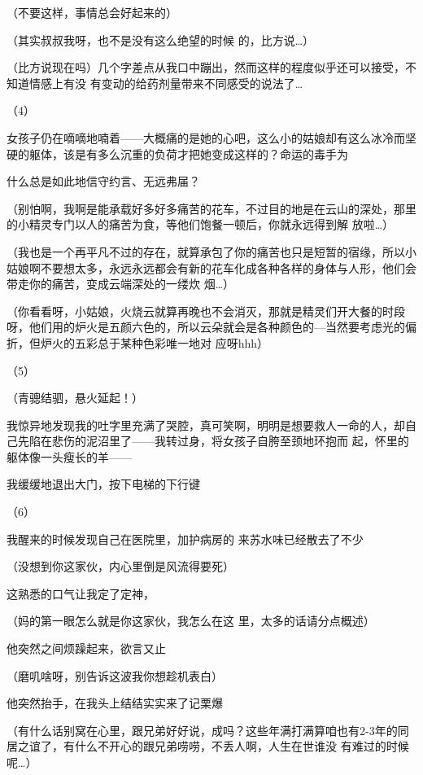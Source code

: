 \documentclass{article}
\begin{document}
（不要这样，事情总会好起来的） 

（其实叔叔我呀，也不是没有这么绝望的时候
的，比方说…） 

（比方说现在吗）几个字差点从我口中蹦出，然而这样的程度似乎还可以接受，不知道情感上有没
有变动的给药剂量带来不同感受的说法了… 


（4） 


女孩子仍在嘀嘀地喃着——大概痛的是她的心吧，这么小的姑娘却有这么冰冷而坚硬的躯体，该是有多么沉重的负荷才把她变成这样的？命运的毒手为

\newpage
什么总是如此地信守约言、无远弗届？ 

（别怕啊，我啊是能承载好多好多痛苦的花车，不过目的地是在云山的深处，那里的小精灵专门以人的痛苦为食，等他们饱餐一顿后，你就永远得到解
放啦…） 

（我也是一个再平凡不过的存在，就算承包了你的痛苦也只是短暂的宿缘，所以小姑娘啊不要想太多，永远永远都会有新的花车化成各种各样的身体与人形，他们会带走你的痛苦，变成云端深处的一缕炊
烟…） 

（你看看呀，小姑娘，火烧云就算再晚也不会消灭，那就是精灵们开大餐的时段呀，他们用的炉火是五颜六色的，所以云朵就会是各种颜色的—当然要考虑光的偏折，但炉火的五彩总于某种色彩唯一地对
应呀hhh） 


（5） 


\newpage

（青骢结驷，悬火延起！） 

我惊异地发现我的吐字里充满了哭腔，真可笑啊，明明是想要救人一命的人，却自己先陷在悲伤的泥沼里了——我转过身，将女孩子自胯至颈地环抱而
起，怀里的躯体像一头瘦长的羊—— 


我缓缓地退出大门，按下电梯的下行键 


（6） 

我醒来的时候发现自己在医院里，加护病房的
来苏水味已经散去了不少 

（没想到你这家伙，内心里倒是风流得要死）


这熟悉的口气让我定了定神， 

（妈的第一眼怎么就是你这家伙，我怎么在这
里，太多的话请分点概述） 


\newpage

他突然之间烦躁起来，欲言又止 


（磨叽啥呀，别告诉这波我你想趁机表白） 


他突然抬手，在我头上结结实实来了记栗爆 

（有什么话别窝在心里，跟兄弟好好说，成吗？这些年满打满算咱也有2-3年的同居之谊了，有什么不开心的跟兄弟唠唠，不丢人啊，人生在世谁没
有难过的时候呢…） 
\end{document}
